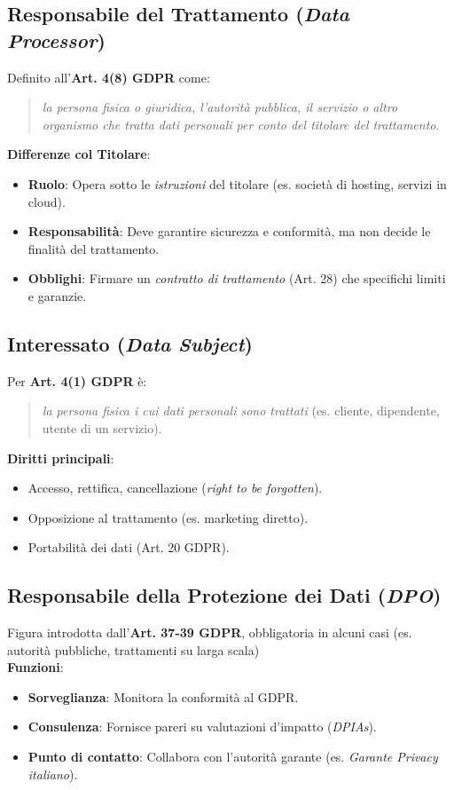 \documentclass[8pt,oneside,a4paper]{article}
\begin{document}
	\subsection{Responsabile del Trattamento (\textit{Data Processor})}
	Definito all'\textbf{Art. 4(8) GDPR} come:
	\begin{quote}
		\textit{la persona fisica o giuridica, l'autorità pubblica, il servizio o altro organismo che tratta dati personali per conto del titolare del trattamento}.
	\end{quote}
	\noindent \textbf{Differenze col Titolare}:
	\begin{itemize}
		\item \textbf{Ruolo}: Opera sotto le \textit{istruzioni} del titolare (es. società di hosting, servizi in cloud).
		\item \textbf{Responsabilità}: Deve garantire sicurezza e conformità, ma non decide le finalità del trattamento.
		\item \textbf{Obblighi}: Firmare un \textit{contratto di trattamento} (Art. 28) che specifichi limiti e garanzie.
	\end{itemize}
	\subsection{Interessato (\textit{Data Subject})}
	Per \textbf{Art. 4(1) GDPR} è:
	\begin{quote}
		\textit{la persona fisica i cui dati personali sono trattati} (es. cliente, dipendente, utente di un servizio).
	\end{quote}
	\noindent \textbf{Diritti principali}:
	\begin{itemize}
		\item Accesso, rettifica, cancellazione (\textit{right to be forgotten}).
		\item Opposizione al trattamento (es. marketing diretto).
		\item Portabilità dei dati (Art. 20 GDPR).
	\end{itemize}
	\subsection{Responsabile della Protezione dei Dati (\textit{DPO})}
	Figura introdotta dall'\textbf{Art. 37-39 GDPR}, obbligatoria in alcuni casi (es. autorità pubbliche, trattamenti su larga scala)\\
	\noindent \textbf{Funzioni}:
	\begin{itemize}
		\item \textbf{Sorveglianza}: Monitora la conformità al GDPR.
		\item \textbf{Consulenza}: Fornisce pareri su valutazioni d'impatto (\textit{DPIAs}).
		\item \textbf{Punto di contatto}: Collabora con l'autorità garante (es. \textit{Garante Privacy italiano}).
	\end{itemize}
\end{document}
